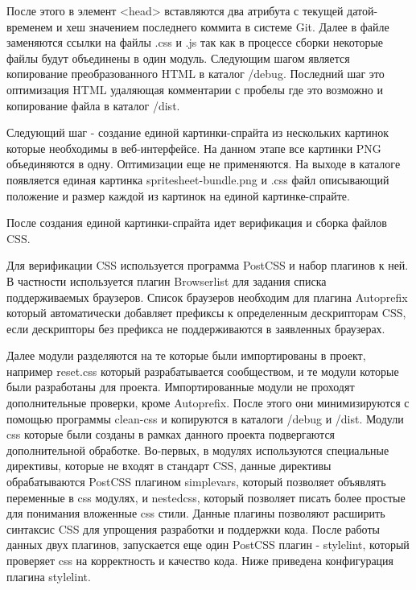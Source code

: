 После этого в элемент <head> вставляются два атрибута с текущей датой-временем и хеш значением последнего коммита в системе Git. Далее в файле заменяются ссылки на файлы .css и .js так как в процессе сборки некоторые файлы будут объединены в один модуль. Следующим шагом является копирование преобразованного HTML в каталог /debug. Последний шаг это оптимизация HTML удаляющая комментарии с пробелы где это возможно и копирование файла в каталог /dist. 

Следующий шаг - создание единой картинки-спрайта из нескольких картинок которые необходимы в веб-интерфейсе. На данном этапе все картинки PNG объединяются в одну. Оптимизации еще не применяются.
На выходе в каталоге появляется единая картинка spritesheet-bundle.png и .css файл описывающий положение и размер каждой из картинок на единой картинке-спрайте.

После создания единой картинки-спрайта идет верификация и сборка файлов CSS.  

Для верификации CSS используется программа PostCSS и набор плагинов к ней. В частности используется плагин Browserlist для задания списка поддерживаемых браузеров. Список браузеров необходим для плагина Autoprefix который автоматически добавляет префиксы к определенным дескрипторам CSS, если дескрипторы без префикса не поддерживаются в заявленных браузерах.

Далее модули разделяются на те которые были импортированы в проект, например reset.css который разрабатывается сообществом, и те модули которые были разработаны для проекта. Импортированные модули не проходят дополнительные проверки, кроме Autoprefix. После этого они минимизируются с помощью программы clean-css и копируются в каталоги /debug и /dist.
Модули css которые были созданы в рамках данного проекта подвергаются дополнительной обработке. Во-первых, в модулях используются специальные директивы, которые не входят в стандарт CSS, данные директивы обрабатываются PostCSS плагином simplevars, который позволяет объявлять переменные в css модулях, и nestedcss, который позволяет писать более простые для понимания вложенные css стили. Данные плагины позволяют расширить синтаксис CSS для упрощения разработки и поддержки кода. После работы данных двух плагинов, запускается еще один PostCSS плагин - stylelint, который проверяет css на корректность и качество кода. Ниже приведена конфигурация плагина stylelint.

